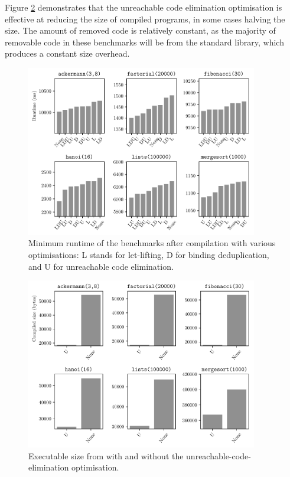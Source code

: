 \documentclass[dissertation.tex]{subfiles}
\begin{document}
{{        Figure \ref{fig:opt-size} demonstrates that the unreachable code elimination optimisation is effective at reducing the size of compiled programs, in some cases halving the size. The amount of removed code is relatively constant, as the majority of removable code in these benchmarks will be from the standard library, which produces a constant size overhead.

        \begin{figure}[H]
            \centering
            \captionsetup{width=0.8\textwidth}
            \includegraphics[width=0.9\textwidth]{graphs/perf_by_opt.pdf}
            \caption{Minimum runtime of the benchmarks after compilation with various optimisations: L stands for let-lifting, D for binding deduplication, and U for unreachable code elimination.}
            \label{fig:opt-perf}
        \end{figure}

        \begin{figure}[H]
            \centering
            \captionsetup{width=0.8\textwidth}
            \includegraphics[width=0.9\textwidth]{graphs/size_by_opt.pdf}
            \caption{Executable size from \compilername with and without the unreachable-code-elimination optimisation.}
            \label{fig:opt-size}
        \end{figure}
    }
}
\end{document}
